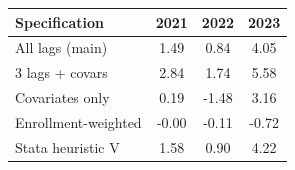 \begin{tabular}{lccc}
\hline
Specification & 2021 & 2022 & 2023 \\
\hline
All lags (main) & 1.49 & 0.84 & 4.05 \\
3 lags + covars & 2.84 & 1.74 & 5.58 \\
Covariates only & 0.19 & -1.48 & 3.16 \\
Enrollment-weighted & -0.00 & -0.11 & -0.72 \\
Stata heuristic V & 1.58 & 0.90 & 4.22 \\
\hline
\end{tabular}
